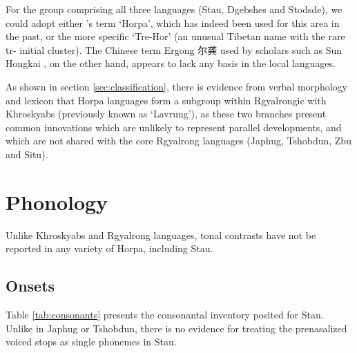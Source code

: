 \documentclass[oneside,a4paper,11pt]{article}
\newcommand{\zh}[1]{{\cn #1}}
\begin{document}
For the group comprising all three languages (Stau, Dgebshes and Stodsde),  we could adopt either 
\citet{jackson00sidaba}'s term `Horpa', which has indeed been used for this area in the past, or the more specific `Tre-Hor' (an unusual Tibetan name with the rare tr- initial cluster).  The Chinese term Ergong \zh{尔龚} used by scholars such as Sun Hongkai \citeyear{sun83liujiang}, on the other hand, appears to lack any basis in the local languages.
 
As shown in section \ref{sec:classification}, there is evidence from verbal morphology and lexicon that Horpa languages form a subgroup within Rgyalrongic with Khroskyabs (previously known as `Lavrung'), as these two branches present common innovations which are unlikely to represent parallel developments, and which are not shared with the core Rgyalrong languages (Japhug, Tshobdun, Zbu and Situ).
 
\section{Phonology}
Unlike Khroskyabs and Rgyalrong languages, tonal contrasts have not be reported in any variety of Horpa, including Stau. 
 
  \subsection{Onsets}
  Table \ref{tab:consonants} presents the consonantal inventory posited for Stau. Unlike in Japhug or Tshobdun, there is no evidence for treating the prenasalized voiced stops as single phonemes in Stau.
  
\end{document}

